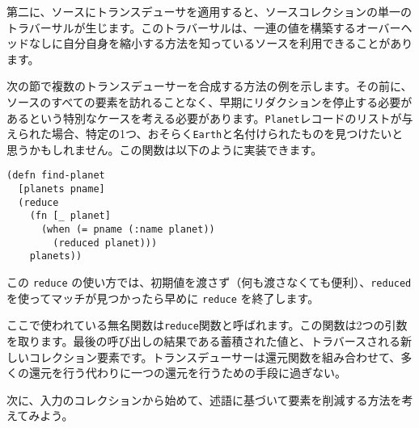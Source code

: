 第二に、ソースにトランスデューサを適用すると、ソースコレクションの単一のトラバーサルが生じます。このトラバーサルは、一連の値を構築するオーバーヘッドなしに自分自身を縮小する方法を知っているソースを利用できることがあります。

次の節で複数のトランスデューサーを合成する方法の例を示します。その前に、ソースのすべての要素を訪れることなく、早期にリダクションを停止する必要があるという特別なケースを考える必要があります。\texttt{Planet}レコードのリストが与えられた場合、特定の1つ、おそらく\texttt{Earth}と名付けられたものを見つけたいと思うかもしれません。この関数は以下のように実装できます。




\begin{lstlisting}[numbers=none]
(defn find-planet
  [planets pname]
  (reduce
    (fn [_ planet]
      (when (= pname (:name planet))
        (reduced planet)))
    planets))
\end{lstlisting}

この \texttt{reduce} の使い方では、初期値を渡さず（何も渡さなくても便利）、\texttt{reduced} を使ってマッチが見つかったら早めに \texttt{reduce} を終了します。

ここで使われている無名関数は\texttt{reduce}関数と呼ばれます。この関数は2つの引数を取ります。最後の呼び出しの結果である蓄積された値と、トラバースされる新しいコレクション要素です。トランスデューサーは還元関数を組み合わせて、多くの還元を行う代わりに一つの還元を行うための手段に過ぎない。

次に、入力のコレクションから始めて、述語に基づいて要素を削減する方法を考えてみよう。




